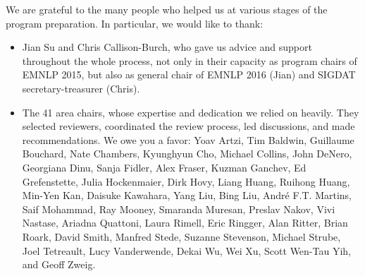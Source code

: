 We are grateful to the many people who helped us at various stages of the program preparation. In particular, we would like to thank:
\begin{itemize}
\item Jian Su and Chris Callison-Burch, who gave us advice and support throughout the whole process, not only in their capacity as program chairs of EMNLP 2015, but also as general chair of EMNLP 2016 (Jian) and SIGDAT secretary-treasurer (Chris).
\item The 41 area chairs, whose expertise and dedication we relied on heavily. They selected reviewers,
  coordinated the review process, led discussions, and made recommendations. We owe you a favor:
  Yoav Artzi, Tim Baldwin, Guillaume Bouchard, Nate Chambers,
  Kyunghyun Cho, Michael Collins, John DeNero, Georgiana Dinu, Sanja
  Fidler, Alex Fraser, Kuzman Ganchev, Ed Grefenstette, Julia
  Hockenmaier, Dirk Hovy, Liang Huang, Ruihong Huang, Min-Yen Kan,
  Daisuke Kawahara, Yang Liu, Bing Liu, Andr{\'e} F.T. Martins, Saif Mohammad,
  Ray Mooney, Smaranda Muresan, Preslav Nakov, Vivi Nastase, Ariadna
  Quattoni, Laura Rimell, Eric Ringger, Alan Ritter, Brian Roark,
  David Smith, Manfred Stede, Suzanne Stevenson, Michael Strube, Joel
  Tetreault, Lucy Vanderwende, Dekai Wu, Wei Xu, Scott Wen-Tau Yih, and
  Geoff Zweig.


\end{itemize}
